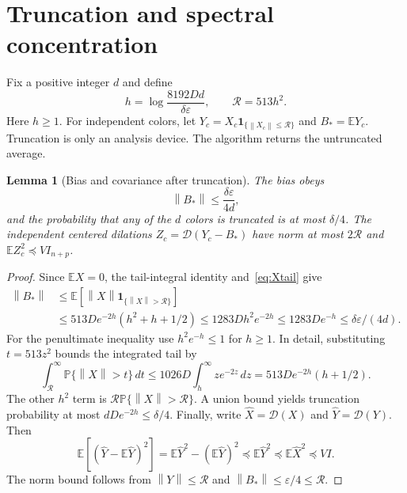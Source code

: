 \documentclass[11pt]{article}
\newtheorem{lemma}[theorem]{Lemma}
\newcommand{\E}{\mathbb E}
\newcommand{\Prob}{\mathbb P}
\newcommand{\norm}[1]{\left\lVert#1\right\rVert}
\newcommand{\DD}{\mathcal D}
\begin{document}
\section{Truncation and spectral concentration}
Fix a positive integer $d$ and define
\begin{equation}\label{eq:truncparams}
 h=\log\frac{8192Dd}{\delta\varepsilon},\qquad \mathcal R=513h^2.
\end{equation}
Here $h\ge1$. For independent colors, let
$Y_c=X_c\mathbf1_{\{\norm{X_c}\le\mathcal R\}}$ and $B_* =\E Y_c$.
Truncation is only an analysis device. The algorithm returns the
untruncated average.

\begin{lemma}[Bias and covariance after truncation]\label{lem:trunc}
The bias obeys
\begin{equation}\label{eq:bias}
 \norm{B_*}\le\frac{\delta\varepsilon}{4d},
\end{equation}
and the probability that any of the $d$ colors is truncated is at most
$\delta/4$. The independent centered dilations
$Z_c=\DD(Y_c-B_*)$ have norm at most $2\mathcal R$ and
$\E Z_c^2\preceq VI_{n+p}$.
\end{lemma}
\begin{proof}
Since $\E X=0$, the tail-integral identity and~\eqref{eq:Xtail} give
\begin{align*}
 \norm{B_*}
 &\le\E[\norm X\mathbf1_{\{\norm X>\mathcal R\}}]\\
 &\le513De^{-2h}(h^2+h+1/2)
 \le1283Dh^2e^{-2h}\le1283De^{-h}
 \le\delta\varepsilon/(4d).
\end{align*}
For the penultimate inequality use $h^2e^{-h}\le1$ for $h\ge1$.
In detail, substituting $t=513z^2$ bounds the integrated tail by
\[
 \int_{\mathcal R}^{\infty}\Prob\{\norm X>t\}\,dt
 \le1026D\int_h^{\infty}ze^{-2z}\,dz
 =513De^{-2h}(h+1/2).
\]
The other $h^2$ term is $\mathcal R\Prob\{\norm X>\mathcal R\}$.
A union bound yields truncation probability at most
$dDe^{-2h}\le\delta/4$. Finally, write
$\widehat X=\DD(X)$ and $\widehat Y=\DD(Y)$. Then
\[
 \E[(\widehat Y-\E\widehat Y)^2]
 =\E\widehat Y^2-(\E\widehat Y)^2
 \preceq\E\widehat Y^2\preceq\E\widehat X^2\preceq VI.
\]
The norm bound follows from $\norm Y\le\mathcal R$ and
$\norm{B_*}\le\varepsilon/4\le\mathcal R$.
\end{proof}
\end{document}
